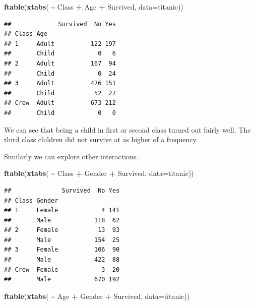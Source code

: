 \documentclass[
]{book}
\newenvironment{Shaded}{\begin{snugshade}}{\end{snugshade}}
\newcommand{\AttributeTok}[1]{\textcolor[rgb]{0.13,0.29,0.53}{#1}}
\newcommand{\FunctionTok}[1]{\textcolor[rgb]{0.13,0.29,0.53}{\textbf{#1}}}
\newcommand{\NormalTok}[1]{#1}
\newcommand{\SpecialCharTok}[1]{\textcolor[rgb]{0.81,0.36,0.00}{\textbf{#1}}}
\begin{document}
\begin{Shaded}
\begin{Highlighting}[]
\FunctionTok{ftable}\NormalTok{(}\FunctionTok{xtabs}\NormalTok{( }\SpecialCharTok{\textasciitilde{}}\NormalTok{ Class }\SpecialCharTok{+}\NormalTok{ Age }\SpecialCharTok{+}\NormalTok{ Survived, }\AttributeTok{data=}\NormalTok{titanic))}
\end{Highlighting}
\end{Shaded}

\begin{verbatim}
##             Survived  No Yes
## Class Age                   
## 1     Adult          122 197
##       Child            0   6
## 2     Adult          167  94
##       Child            0  24
## 3     Adult          476 151
##       Child           52  27
## Crew  Adult          673 212
##       Child            0   0
\end{verbatim}

We can see that being a child in first or second class turned out fairly well. The third class children did not survive at as higher of a frequency.

Similarly we can explore other interactions.

\begin{Shaded}
\begin{Highlighting}[]
\FunctionTok{ftable}\NormalTok{(}\FunctionTok{xtabs}\NormalTok{( }\SpecialCharTok{\textasciitilde{}}\NormalTok{ Class }\SpecialCharTok{+}\NormalTok{ Gender }\SpecialCharTok{+}\NormalTok{ Survived, }\AttributeTok{data=}\NormalTok{titanic))}
\end{Highlighting}
\end{Shaded}

\begin{verbatim}
##              Survived  No Yes
## Class Gender                 
## 1     Female            4 141
##       Male            118  62
## 2     Female           13  93
##       Male            154  25
## 3     Female          106  90
##       Male            422  88
## Crew  Female            3  20
##       Male            670 192
\end{verbatim}

\begin{Shaded}
\begin{Highlighting}[]
\FunctionTok{ftable}\NormalTok{(}\FunctionTok{xtabs}\NormalTok{( }\SpecialCharTok{\textasciitilde{}}\NormalTok{ Age }\SpecialCharTok{+}\NormalTok{ Gender }\SpecialCharTok{+}\NormalTok{ Survived, }\AttributeTok{data=}\NormalTok{titanic))}
\end{Highlighting}
\end{Shaded}
\end{document}

